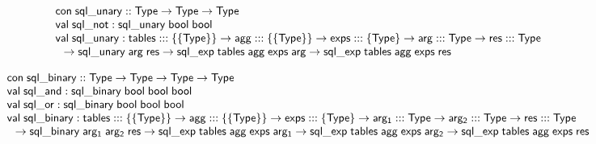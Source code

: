 \documentclass{article}
\newcommand{\mt}[1]{\mathsf{#1}}
\begin{document}
$$\begin{array}{l}
  \mt{con} \; \mt{sql\_unary} :: \mt{Type} \to \mt{Type} \to \mt{Type} \\
  \mt{val} \; \mt{sql\_not} : \mt{sql\_unary} \; \mt{bool} \; \mt{bool} \\
  \mt{val} \; \mt{sql\_unary} : \mt{tables} ::: \{\{\mt{Type}\}\} \to \mt{agg} ::: \{\{\mt{Type}\}\} \to \mt{exps} ::: \{\mt{Type}\} \to \mt{arg} ::: \mt{Type} \to \mt{res} ::: \mt{Type} \\
  \hspace{.1in} \to \mt{sql\_unary} \; \mt{arg} \; \mt{res} \to \mt{sql\_exp} \; \mt{tables} \; \mt{agg} \; \mt{exps} \; \mt{arg} \to \mt{sql\_exp} \; \mt{tables} \; \mt{agg} \; \mt{exps} \; \mt{res} \\
\end{array}$$

$$\begin{array}{l}
  \mt{con} \; \mt{sql\_binary} :: \mt{Type} \to \mt{Type} \to \mt{Type} \to \mt{Type} \\
  \mt{val} \; \mt{sql\_and} : \mt{sql\_binary} \; \mt{bool} \; \mt{bool} \; \mt{bool} \\
  \mt{val} \; \mt{sql\_or} : \mt{sql\_binary} \; \mt{bool} \; \mt{bool} \; \mt{bool} \\
  \mt{val} \; \mt{sql\_binary} : \mt{tables} ::: \{\{\mt{Type}\}\} \to \mt{agg} ::: \{\{\mt{Type}\}\} \to \mt{exps} ::: \{\mt{Type}\} \to \mt{arg_1} ::: \mt{Type} \to \mt{arg_2} ::: \mt{Type} \to \mt{res} ::: \mt{Type} \\
  \hspace{.1in} \to \mt{sql\_binary} \; \mt{arg_1} \; \mt{arg_2} \; \mt{res} \to \mt{sql\_exp} \; \mt{tables} \; \mt{agg} \; \mt{exps} \; \mt{arg_1} \to \mt{sql\_exp} \; \mt{tables} \; \mt{agg} \; \mt{exps} \; \mt{arg_2} \to \mt{sql\_exp} \; \mt{tables} \; \mt{agg} \; \mt{exps} \; \mt{res}
\end{array}$$
\end{document}
